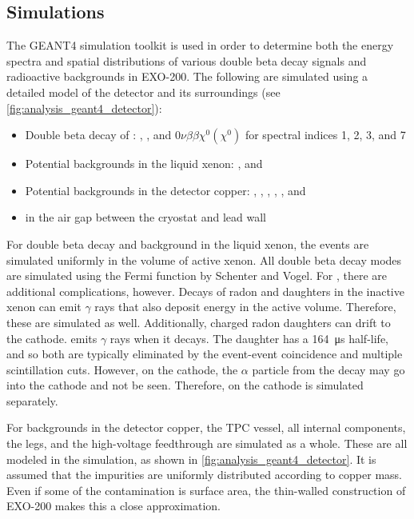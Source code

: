 \documentclass[herrin-thesis.tex]{subfiles}
\begin{document}
\subsection{Simulations}
The GEANT4 simulation toolkit\cite{Agostinelli:2003fk} is used in order to determine both the energy spectra and spatial distributions of various double beta decay signals and radioactive backgrounds in EXO-200. The following are simulated using a detailed model of the detector and its surroundings (see \cref{fig:analysis_geant4_detector}):
\begin{itemize}
\item Double beta decay of :
	\twonu{},
	\zeronu{},
	and \(0\nu\beta\beta\chi^{0}(\chi^{0})\) for spectral indices 1, 2, 3, and 7
\item Potential backgrounds in the liquid xenon:
	,
	and 
\item Potential backgrounds in the detector copper:
	, 
	,
	,
	,
	,
	and 
\item {} in the air gap between the cryostat and lead wall
\end{itemize}

For double beta decay and background in the liquid xenon, the events are simulated uniformly in the volume of active xenon. All double beta decay modes are simulated using the Fermi function by Schenter and Vogel\cite{Schenter:1983uq}. For , there are additional complications, however. Decays of radon and daughters in the inactive xenon can emit \(\gamma\) rays that also deposit energy in the active volume. Therefore, these are simulated as well. Additionally, charged radon daughters can drift to the cathode.  emits \(\gamma\) rays when it decays. The daughter  has a \SI{164}{\micro\s} half-life, and so both are typically eliminated by the event-event coincidence and multiple scintillation cuts. However, on the cathode, the \(\alpha\) particle from the  decay may go into the cathode and not be seen. Therefore,  on the cathode is simulated separately.

For backgrounds in the detector copper, the TPC vessel, all internal components, the legs, and the high-voltage feedthrough are simulated as a whole. These are all modeled in the simulation, as shown in \cref{fig:analysis_geant4_detector}. It is assumed that the impurities are uniformly distributed according to copper mass. Even if some of the contamination is surface area, the thin-walled construction of EXO-200 makes this a close approximation.
\end{document}
